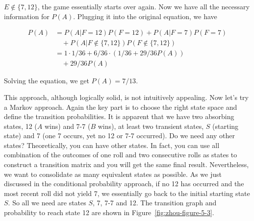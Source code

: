 \begin{solution}
$E\notin\{7,12\}$, the game essentially starts over again. Now we have all the necessary
information for $P(A)$. Plugging it into the original equation, we have

\[
\begin{aligned}
P(A)&=P(A\vert F=12)P(F=12)+P(A\vert F=7)P(F=7)\\
&\quad+P(A\vert F\notin\{7,12\})P(F\notin\{7,12\})\\
&=1\cdot1/36+6/36\cdot(1/36+29/36P(A))\\
&\quad+29/36P(A)
\end{aligned}
\]

Solving the equation, we get $P(A)=7/13$.

This approach, although logically solid, is not intuitively appealing. Now let's try a
Markov approach. Again the key part is to choose the right state space and define the
transition probabilities. It is apparent that we have two absorbing states, 12 ($A$ wins)
and 7-7 ($B$ wins), at least two transient states, $S$ (starting state) and 7 (one 7
occurs, yet no 12 or 7-7 occurred). Do we need any other states? Theoretically, you can
have other states. In fact, you can use all combination of the outcomes of one roll and two
consecutive rolls as states to construct a transition matrix and you will get the same final
result. Nevertheless, we want to consolidate as many equivalent states as possible. As we
just discussed in the conditional probability approach, if no 12 has occurred and the most
recent roll did not yield 7, we essentially go back to the initial starting state $S$. So all
we need are states $S$, 7, 7-7 and 12. The transition graph and probability to reach state
12 are shown in Figure~\ref{fig:zhou-figure-5-3}.


\end{solution}
